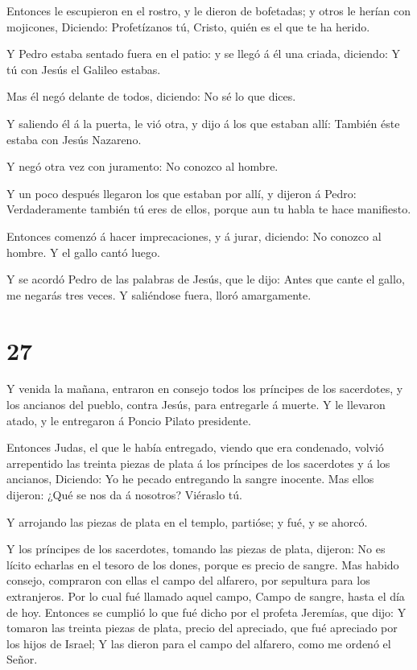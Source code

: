  Entonces le escupieron en el rostro, y le dieron de
bofetadas; y otros le herían con mojicones,  Diciendo:
Profetízanos tú, Cristo, quién es el que te ha herido.

 Y Pedro estaba sentado fuera en el patio: y se llegó á él
una criada, diciendo: Y tú con Jesús el Galileo estabas.

 Mas él negó delante de todos, diciendo: No sé lo que
dices.

 Y saliendo él á la puerta, le vió otra, y dijo á los que
estaban allí: También éste estaba con Jesús Nazareno.

 Y negó otra vez con juramento: No conozco al hombre.

 Y un poco después llegaron los que estaban por allí, y
dijeron á Pedro: Verdaderamente también tú eres de ellos, porque aun tu
habla te hace manifiesto.

 Entonces comenzó á hacer imprecaciones, y á jurar,
diciendo: No conozco al hombre. Y el gallo cantó luego.

 Y se acordó Pedro de las palabras de Jesús, que le dijo:
Antes que cante el gallo, me negarás tres veces. Y saliéndose fuera,
lloró amargamente.

\hypertarget{section-26}{%
\section{27}\label{section-26}}

 Y venida la mañana, entraron en consejo todos los príncipes
de los sacerdotes, y los ancianos del pueblo, contra Jesús, para
entregarle á muerte.  Y le llevaron atado, y le entregaron á
Poncio Pilato presidente.

 Entonces Judas, el que le había entregado, viendo que era
condenado, volvió arrepentido las treinta piezas de plata á los
príncipes de los sacerdotes y á los ancianos,  Diciendo: Yo
he pecado entregando la sangre inocente. Mas ellos dijeron: ¿Qué se nos
da á nosotros? Viéraslo tú.

 Y arrojando las piezas de plata en el templo, partióse; y
fué, y se ahorcó.

 Y los príncipes de los sacerdotes, tomando las piezas de
plata, dijeron: No es lícito echarlas en el tesoro de los dones, porque
es precio de sangre.  Mas habido consejo, compraron con
ellas el campo del alfarero, por sepultura para los extranjeros.
 Por lo cual fué llamado aquel campo, Campo de sangre, hasta
el día de hoy.  Entonces se cumplió lo que fué dicho por el
profeta Jeremías, que dijo: Y tomaron las treinta piezas de plata,
precio del apreciado, que fué apreciado por los hijos de Israel;
 Y las dieron para el campo del alfarero, como me ordenó el
Señor.

